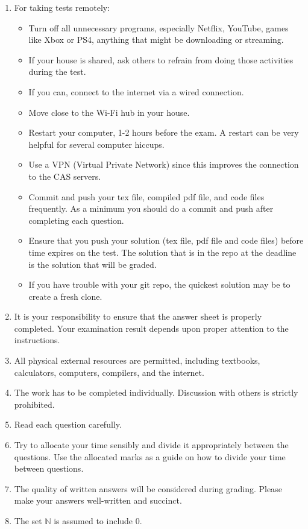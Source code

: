 \documentclass[12pt,fleqn]{examtst}
\begin{document}
\begin{enumerate}

\item For taking tests remotely: 
\begin{itemize}
\item Turn off all unnecessary programs, especially Netflix, YouTube, games like
  Xbox or PS4, anything that might be downloading or streaming.
\item If your house is shared, ask others to refrain from doing those activities
  during the test.
\item If you can, connect to the internet via a wired connection.
\item Move close to the Wi-Fi hub in your house. 
\item Restart your computer, 1-2 hours before the exam. A restart can be very
  helpful for several computer hiccups.
\item Use a VPN (Virtual Private Network) since this improves the connection to
  the CAS servers.
\item Commit and push your tex file, compiled pdf file, and code files
  frequently.  As a minimum you should do a commit and push after completing
  each question.
\item Ensure that you push your solution (tex file, pdf file and code files)
  before time expires on the test.  The solution that is in the repo at the
  deadline is the solution that will be graded.
\item If you have trouble with your git repo, the quickest solution may be to
  create a fresh clone.
\end{itemize}
\item It is your responsibility to ensure that the answer sheet is properly
  completed. Your examination result depends upon proper attention to the
  instructions.
\item All physical external resources are permitted, including textbooks, calculators,
  computers, compilers, and the internet.
\item The work has to be completed individually.  Discussion with others is
  strictly prohibited.
\item Read each question carefully.
\item Try to allocate your time sensibly and divide it appropriately between the
  questions.  Use the allocated marks as a guide on how to divide your time
  between questions.
\item The quality of written answers will be considered during grading.  Please
  make your answers well-written and succinct.
\item The set $\mathbb{N}$ is assumed to include $0$.
\end{enumerate}
\end{document}
